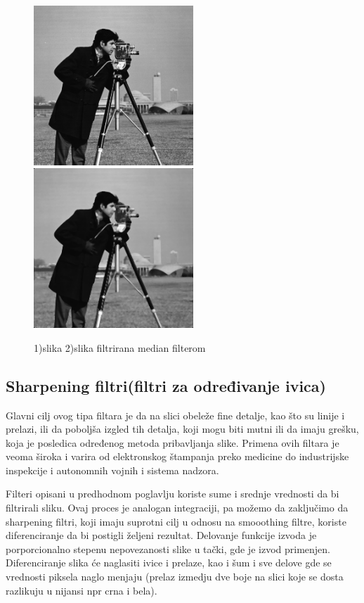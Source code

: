 \documentclass[a4paper,12pt,titlepage]{article}
\begin{document}
\begin{figure}[ht!]
\centering
\includegraphics[width=60mm]{img/img.png}
\includegraphics[width=60mm]{img/imgMed.png}
\caption{1)slika 2)slika filtrirana median filterom}
\label{overflow}
\end{figure}

\subsection{Sharpening filtri(filtri za određivanje ivica)}%

Glavni cilj ovog tipa filtara je da na slici obeleže fine detalje, kao što su linije i prelazi, ili da poboljša izgled tih detalja, koji mogu biti mutni ili da imaju grešku, koja je posledica određenog metoda pribavljanja slike. Primena ovih filtara je veoma široka i varira od elektronskog štampanja preko medicine do industrijske inspekcije i autonomnih vojnih i sistema nadzora. 

Filteri opisani u predhodnom poglavlju koriste sume i srednje vrednosti da bi filtrirali sliku. Ovaj proces je analogan integraciji, pa možemo da zaključimo da sharpening filtri, koji imaju suprotni cilj u odnosu na smooothing filtre, koriste diferenciranje da bi postigli željeni rezultat. Delovanje funkcije izvoda je porporcionalno stepenu nepovezanosti slike u tački, gde je izvod primenjen. Diferenciranje slika će naglasiti ivice i prelaze, kao i šum i sve delove gde se vrednosti piksela naglo menjaju (prelaz izmedju dve boje na slici koje se dosta razlikuju u nijansi npr crna i bela).
\end{document}

